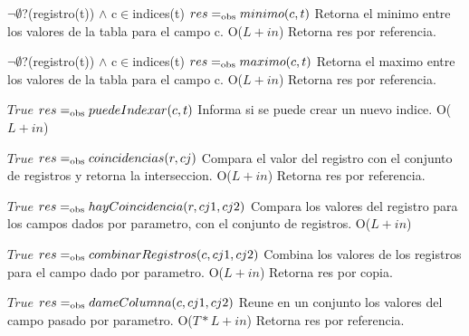  {$\neg\emptyset$?(registro(t)) $\land$ c$\in$indices(t)}
 {$res =_{\mathrm{obs}} minimo(c,t)$}
 {Retorna el minimo entre los valores de la tabla para el campo c.}
 {O($L+in$)}
 {Retorna res por referencia.}
  
 {$\neg\emptyset$?(registro(t)) $\land$ c$\in$indices(t)}
 {$res =_{\mathrm{obs}} maximo(c,t)$}
 {Retorna el maximo entre los valores de la tabla para el campo c.}
 {O($L+in$)}
 {Retorna res por referencia.} 

 {$True$}
 {$res =_{\mathrm{obs}} puedeIndexar(c,t)$}
 {Informa si se puede crear un nuevo indice.}
 {O($L+in$)}
 {} 


 {$True$}
 {$res =_{\mathrm{obs}} coincidencias(r,cj)$}
 {Compara el valor del registro con el conjunto de registros y retorna la interseccion.}%
 {O($L+in$)}%
 {Retorna res por referencia.} 

 {$True$}
 {$res =_{\mathrm{obs}} hayCoincidencia(r,cj1,cj2)$}
 {Compara los valores del registro para los campos dados por parametro, con el conjunto de registros.}
 {O($L+in$)}%
 {} 


 {$True$}%
 {$res =_{\mathrm{obs}} combinarRegistros(c,cj1,cj2)$}
 {Combina los valores de los registros para el campo dado por parametro.}
 {O($L+in$)}%
 {Retorna res por copia.}%

 {$True$}%
 {$res =_{\mathrm{obs}} dameColumna(c,cj1,cj2)$}
 {Reune en un conjunto los valores del campo pasado por parametro.}
 {O($T*L+in$)}%
 {Retorna res por referencia.} 

